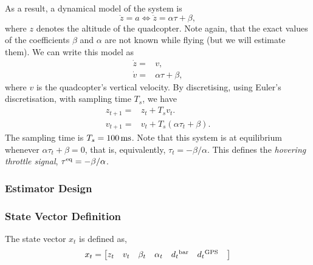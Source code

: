\documentclass{article}
\begin{document}
  As a result, a dynamical model of the system is
  \begin{equation}
    \ddot{z} {}={} a \Leftrightarrow \ddot{z} {}={} \alpha \tau + \beta,
  \end{equation}
  where $z$ denotes the altitude of the quadcopter. Note again, that the exact
  values of the coefficients $\beta$ and $\alpha$ are not known while flying
  (but we will estimate them). We can write this model as
  \begin{subequations}
    \begin{align}
      \dot{z} {}={} & v,
      \\
      \dot{v} {}={} & \alpha \tau + \beta,
    \end{align}
  \end{subequations}
  where $v$ is the quadcopter's vertical velocity. By discretising, using
  Euler's discretisation, with sampling time $T_s$, we have
  \begin{subequations}\label{eq:basic-mdl}
    \begin{align}
      z_{t+1} {}={} & z_t + T_s v_t.
      \\
      v_{t+1} {}={} & v_t + T_s(\alpha \tau_t + \beta).
    \end{align}
  \end{subequations}
  The sampling time is $T_s = \unit[100]{ms}$. Note that this system is at
  equilibrium whenever $\alpha \tau_t + \beta = 0$, that is, equivalently,
  $\tau_t = -\beta / \alpha$. This defines the \textit{hovering throttle
  signal}, $\tau^{\rm eq} = -\beta / \alpha$.


    \subsubsection*{Estimator Design}\label{estimator_design}
    \subsubsection*{State Vector Definition}
    The state vector \( x_t \) is defined as,
    \begin{equation}
        x_t = 
        \begin{bmatrix}
            z_t &
            v_{t} & 
            \beta_t & 
            \alpha_t &
            d{_t}^{\rm bar}&
            d{_t}^{\rm GPS}&
        \end{bmatrix}
        \label{stateVectorXt}
    \end{equation}
\end{document}
